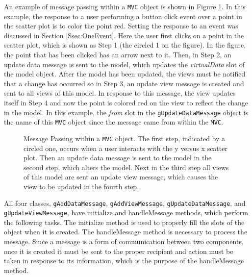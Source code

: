 \documentclass{article}[11pt]
\newcommand{\Rfunction}[1]{{\textsf{#1}}}
\newcommand{\Robject}[1]{{\texttt{#1}}}
\newcommand{\Rslot}[1]{\textsl{#1}}
\newcommand{\Rclass}[1]{\texttt{#1}}
\begin{document}
An example of message passing within a \Robject{MVC} object is shown in Figure
\ref{Fig:MPwithin}.  In this example, the response to a user performing a
button click event over a point in the scatter plot is to color the point red.
Setting the response to an event was discussed in Section
\ref{Ssec:OneEvent}.  Here the user first clicks on a point in the
scatter plot, which is shown as Step 1 (the circled 1 on the figure).  In the
figure, the point that has been clicked has an arrow next to it.  Then, in
Step 2, an update data message is sent to the model, which updates
the \Rslot{virtualData} slot of the model object.  After the
model has been updated, the views must be notified that a
change has occurred so in Step 3, an update view message is created and sent
to all views of this model.  In response to this
message, the view updates itself in Step 4 and now the
point is colored red on the view to reflect the change in the
model.  In this example, the \Rslot{from} slot in the
\Robject{gUpdateDataMessage} object is the name of this \Robject{MVC} object
since the message came from within the \Robject{MVC}. 

\begin{figure}[ht]
  \begin{center}
    \caption{ Message Passing within a \Robject{MVC} object.  The first step,
      indicated by a circled one, occurs when a user interacts with the y
      versus x scatter plot.  Then an update data message is sent to the model
      in the second step, which alters the model.  Next in the third step all
      views of this model are sent an update view message, which causes the
      view to be updated in the fourth step. }
    \label{Fig:MPwithin}
  \end{center}
\end{figure}

All four classes, \Rclass{gAddDataMessage}, \Rclass{gAddViewMessage},
\Rclass{gUpdateDataMessage}, and \Rclass{gUpdateViewMessage}, have
\Rfunction{initialize} and \Rfunction{handleMessage} methods, which perform
the following tasks.  The \Rfunction{initialize} method is used to properly
fill the slots of the object when it is created.  The
\Rfunction{handleMessage} method is necessary to process the message.  Since a
message is a form of communication between two components, once it is created
it must be sent to the proper recipient and action must be taken in response
to its information, which is the purpose of the \Rfunction{handleMessage}
method. 
\end{document}
